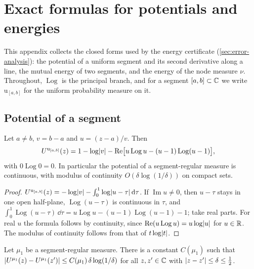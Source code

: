 \section{Exact formulas for potentials and energies}\label{sec:exact-formulas}

This appendix collects the closed forms used by the energy certificate
(\cref{sec:error-analysis}): the potential of a uniform segment and its second derivative along a
line, the mutual energy of two segments, and the energy of the node measure $\nu$. Throughout, $\operatorname{Log}$ is the principal branch, and for a segment $[a,b]\subset\mathbb{C}$ we
write $\mathrm u_{[a,b]}$ for the uniform probability measure on it.

\subsection{Potential of a segment}\label{subsec:segment-potential}

\begin{lemma}\label{lem:segment-potential}
Let $a\ne b$, $v=b-a$ and $u=(z-a)/v$. Then
\[
  U^{\mathrm u_{[a,b]}}(z)=1-\log\lvert v\rvert-\operatorname{Re}\bigl[u\operatorname{Log}u-(u-1)\operatorname{Log}(u-1)\bigr],
\]
with $0\operatorname{Log}0=0$. In particular the potential of a segment-regular measure is continuous,
with modulus of continuity $O(\delta\log(1/\delta))$ on compact sets.
\end{lemma}

\begin{proof}
$U^{\mathrm u_{[a,b]}}(z)=-\log\lvert v\rvert-\int_0^1\log\lvert u-\tau\rvert\,\mathrm{d}\tau$. If
$\operatorname{Im}u\ne0$, then $u-\tau$ stays in one open half-plane, $\operatorname{Log}(u-\tau)$ is
continuous in $\tau$, and
$\int_0^1\operatorname{Log}(u-\tau)\,\dd\tau=u\operatorname{Log}u-(u-1)\operatorname{Log}(u-1)-1$; take real
parts. For real $u$ the formula follows by continuity, since
$\operatorname{Re}(u\operatorname{Log}u)=u\log\lvert u\rvert$ for $u\in\mathbb{R}$. The modulus of continuity
follows from that of $t\log\lvert t\rvert$.
\end{proof}

\begin{lemma}\label{lem:uniform-continuity}
Let $\mu_1$ be a segment-regular measure. There is a constant $C(\mu_1)$ such that
$\lvert U^{\mu_1}(z)-U^{\mu_1}(z')\rvert\le C(\mu_1)\,\delta\log(1/\delta)$ for all $z,z'\in\mathbb{C}$ with
$\lvert z-z'\rvert\le\delta\le\frac12$.
\end{lemma}

